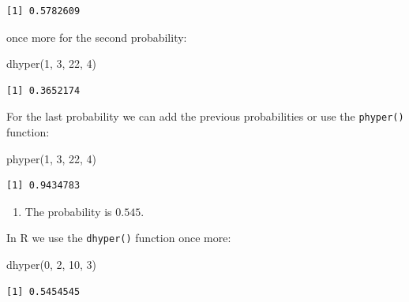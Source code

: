 \documentclass[
  letterpaper,
  DIV=11,
  numbers=noendperiod]{scrreprt}
\newenvironment{Shaded}{\begin{snugshade}}{\end{snugshade}}
\newcommand{\DecValTok}[1]{\textcolor[rgb]{0.68,0.00,0.00}{#1}}
\newcommand{\FunctionTok}[1]{\textcolor[rgb]{0.28,0.35,0.67}{#1}}
\newcommand{\NormalTok}[1]{\textcolor[rgb]{0.00,0.23,0.31}{#1}}
\providecommand{\tightlist}{%
  \setlength{\itemsep}{0pt}\setlength{\parskip}{0pt}}\usepackage{longtable,booktabs,array}
\begin{document}
\begin{verbatim}
[1] 0.5782609
\end{verbatim}

once more for the second probability:

\begin{Shaded}
\begin{Highlighting}[numbers=left,,]
\FunctionTok{dhyper}\NormalTok{(}\DecValTok{1}\NormalTok{, }\DecValTok{3}\NormalTok{, }\DecValTok{22}\NormalTok{, }\DecValTok{4}\NormalTok{)}
\end{Highlighting}
\end{Shaded}

\begin{verbatim}
[1] 0.3652174
\end{verbatim}

For the last probability we can add the previous probabilities or use
the \texttt{phyper()} function:

\begin{Shaded}
\begin{Highlighting}[numbers=left,,]
\FunctionTok{phyper}\NormalTok{(}\DecValTok{1}\NormalTok{, }\DecValTok{3}\NormalTok{, }\DecValTok{22}\NormalTok{, }\DecValTok{4}\NormalTok{)}
\end{Highlighting}
\end{Shaded}

\begin{verbatim}
[1] 0.9434783
\end{verbatim}

\begin{blackbox}

\begin{enumerate}
\def\labelenumi{\arabic{enumi}.}
\setcounter{enumi}{1}
\tightlist
\item
  The probability is \(0.545\).
\end{enumerate}

\end{blackbox}

In R we use the \texttt{dhyper()} function once more:

\begin{Shaded}
\begin{Highlighting}[numbers=left,,]
\FunctionTok{dhyper}\NormalTok{(}\DecValTok{0}\NormalTok{, }\DecValTok{2}\NormalTok{, }\DecValTok{10}\NormalTok{, }\DecValTok{3}\NormalTok{)}
\end{Highlighting}
\end{Shaded}

\begin{verbatim}
[1] 0.5454545
\end{verbatim}
\end{document}

